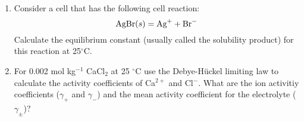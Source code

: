 \begin{enumerate}
\item Consider a cell that has the following cell reaction:
$$\textnormal{AgBr}(s) = \textnormal{Ag}^+ + \textnormal{Br}^-$$
Calculate the equilibrium constant (usually called the solubility product) for this reaction at 25$^\circ$C.\\


\item For 0.002 mol kg$^{-1}$ CaCl$_2$ at 25 $^\circ$C use the Debye-H\"uckel limiting law to calculate the activity coefficients of Ca$^{2+}$ and Cl$^-$. What are the ion activitiy coefficients ($\gamma_+$ and $\gamma_-$) and the mean activity coefficient for the electrolyte ($\gamma_{\pm}$)?\\


\end{enumerate}

